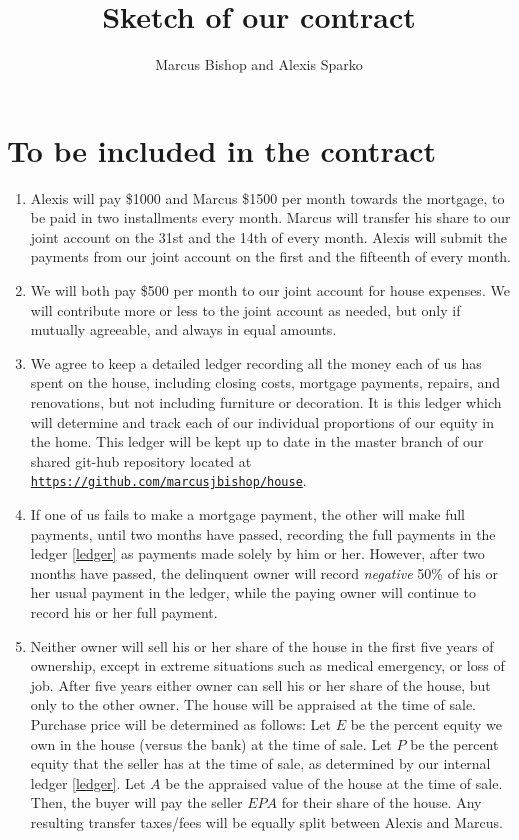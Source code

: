 \documentclass[12pt]{article}
\title{Sketch of our contract}
\author{Marcus Bishop and Alexis Sparko}
\begin{document}
\maketitle

\section{To be included in the contract}
\begin{enumerate}

\item Alexis will pay \$1000 and Marcus \$1500 per month towards the 
mortgage, to be paid in two installments every month. Marcus will 
transfer his share to our joint account on the 31st and the 14th of 
every month. Alexis will submit the payments from our joint account 
on the first and the fifteenth of every month.

\item We will both pay \$500 per month to our joint account for house 
expenses. We will contribute more or less to the joint account as 
needed, but only if mutually agreeable, and always in equal amounts.

\item\label{ledger} We agree to keep a detailed ledger recording all 
the money each of us has spent on the house, including closing costs, 
mortgage payments, repairs, and renovations, but not including 
furniture or decoration. It is this ledger which will determine and 
track each of our individual proportions of our equity in the home. 
This ledger will be kept up to date in the master branch of our 
shared git-hub repository located at 
\href{ttps://github.com/marcusjbishop/house}
{\tt https://github.com/marcusjbishop/house}.

\item If one of us fails to make a mortgage payment, the other will 
make full payments, until two months have passed, recording the full 
payments in the ledger \autoref{ledger} as payments made solely by 
him or her. However, after two months have passed, the delinquent 
owner will record {\em negative} 50\% of his or her usual payment in 
the ledger, while the paying owner will continue to record his or her 
full payment.

\item Neither owner will sell his or her share of the house in the 
first five years of ownership, except in extreme situations such as 
medical emergency, or loss of job. After five years either owner can 
sell his or her share of the house, but only to the other owner. The 
house will be appraised at the time of sale. Purchase price will be 
determined as follows: Let $E$ be the percent equity we own in the 
house (versus the bank) at the time of sale. Let $P$ be the percent 
equity that the seller has at the time of sale, as determined by our 
internal ledger \autoref{ledger}. Let $A$ be the appraised value of 
the house at the time of sale. Then, the buyer will pay the seller 
$EPA$ for their share of the house. Any resulting transfer 
taxes/fees will be equally split between Alexis and Marcus.
 
\end{enumerate}
\end{document}
